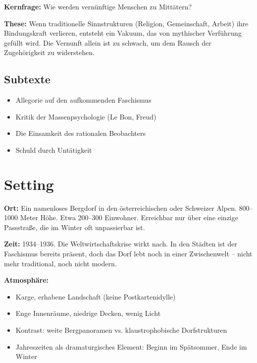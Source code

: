 \documentclass[11pt,a4paper,twoside]{book}
\begin{document}
\textbf{Kernfrage:} Wie werden vernünftige Menschen zu Mittätern?

\textbf{These:} Wenn traditionelle Sinnstrukturen (Religion, Gemeinschaft, Arbeit) ihre Bindungskraft verlieren, entsteht ein Vakuum, das von mythischer Verführung gefüllt wird. Die Vernunft allein ist zu schwach, um dem Rausch der Zugehörigkeit zu widerstehen.

\subsection{Subtexte}
\begin{itemize}
    \item Allegorie auf den aufkommenden Faschismus
    \item Kritik der Massenpsychologie (Le Bon, Freud)
    \item Die Einsamkeit des rationalen Beobachters
    \item Schuld durch Untätigkeit
\end{itemize}

\section{Setting}

\textbf{Ort:} Ein namenloses Bergdorf in den österreichischen oder Schweizer Alpen. 800--1000 Meter Höhe. Etwa 200--300 Einwohner. Erreichbar nur über eine einzige Passstraße, die im Winter oft unpassierbar ist.

\textbf{Zeit:} 1934--1936. Die Weltwirtschaftskrise wirkt nach. In den Städten ist der Faschismus bereits präsent, doch das Dorf lebt noch in einer Zwischenwelt -- nicht mehr traditional, noch nicht modern.

\textbf{Atmosphäre:}
\begin{itemize}
    \item Karge, erhabene Landschaft (keine Postkartenidylle)
    \item Enge Innenräume, niedrige Decken, wenig Licht
    \item Kontrast: weite Bergpanoramen vs. klaustrophobische Dorfstrukturen
    \item Jahreszeiten als dramaturgisches Element: Beginn im Spätsommer, Ende im Winter
\end{itemize}

\end{document}
